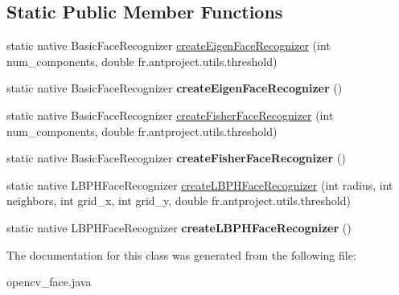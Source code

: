 \subsection*{Static Public Member Functions}
\begin{DoxyCompactItemize}
\item 
static native Basic\+Face\+Recognizer \hyperlink{group__face_ga6f3a56396530d46af3fba9ad04fc80cf}{create\+Eigen\+Face\+Recognizer} (int num\+\_\+components, double fr.antproject.utils.threshold)
\item 
static native Basic\+Face\+Recognizer {\bfseries create\+Eigen\+Face\+Recognizer} ()
\item 
static native Basic\+Face\+Recognizer \hyperlink{group__face_ga80a98f353dd2ef661444e0d79bbe9daf}{create\+Fisher\+Face\+Recognizer} (int num\+\_\+components, double fr.antproject.utils.threshold)
\item 
static native Basic\+Face\+Recognizer {\bfseries create\+Fisher\+Face\+Recognizer} ()
\item 
static native L\+B\+P\+H\+Face\+Recognizer \hyperlink{group__face_ga970c161034e055fb56615aadba87ac4e}{create\+L\+B\+P\+H\+Face\+Recognizer} (int radius, int neighbors, int grid\+\_\+x, int grid\+\_\+y, double fr.antproject.utils.threshold)
\item 
static native L\+B\+P\+H\+Face\+Recognizer {\bfseries create\+L\+B\+P\+H\+Face\+Recognizer} ()
\end{DoxyCompactItemize}


The documentation for this class was generated from the following file\+:\begin{DoxyCompactItemize}
\item 
opencv\+\_\+face.\+java\end{DoxyCompactItemize}
